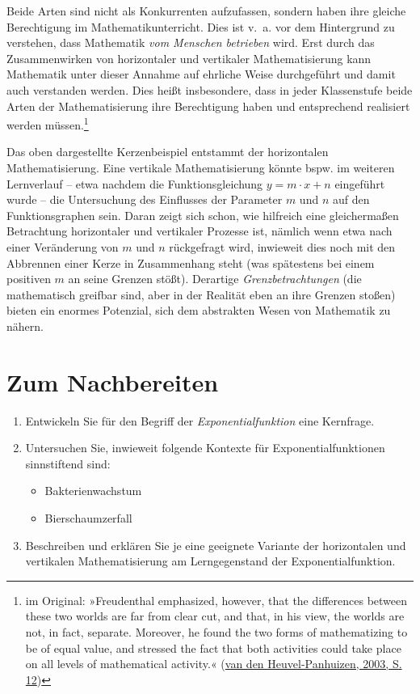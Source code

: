\documentclass[
]{scrbook}
\providecommand{\tightlist}{%
  \setlength{\itemsep}{0pt}\setlength{\parskip}{0pt}}
\theoremstyle{definition}
\theoremstyle{definition}
\theoremstyle{definition}
\theoremstyle{definition}
\theoremstyle{remark}
\begin{document}
Beide Arten sind nicht als Konkurrenten aufzufassen, sondern haben ihre gleiche Berechtigung im Mathematikunterricht. Dies ist v.~a. vor dem Hintergrund zu verstehen, dass Mathematik \emph{vom Menschen betrieben} wird. Erst durch das Zusammenwirken von horizontaler und vertikaler Mathematisierung kann Mathematik unter dieser Annahme auf ehrliche Weise durchgeführt und damit auch verstanden werden. Dies heißt insbesondere, dass in jeder Klassenstufe beide Arten der Mathematisierung ihre Berechtigung haben und entsprechend realisiert werden müssen.\footnote{im Original: »Freudenthal emphasized, however, that the differences between these two worlds are far from clear cut, and that, in his view, the worlds are not, in fact, separate. Moreover, he found the two forms of mathematizing to be of equal value, and stressed the fact that both activities could take place on all levels of mathematical activity.« (\protect\hyperlink{ref-vandenHeuvel-Panhuizen2003}{van den Heuvel-Panhuizen, 2003, S. 12})}

Das oben dargestellte Kerzenbeispiel entstammt der horizontalen Mathematisierung. Eine vertikale Mathematisierung könnte bspw. im weiteren Lernverlauf -- etwa nachdem die Funktionsgleichung \(y = m\cdot x + n\) eingeführt wurde -- die Untersuchung des Einflusses der Parameter \(m\) und \(n\) auf den Funktionsgraphen sein. Daran zeigt sich schon, wie hilfreich eine gleichermaßen Betrachtung horizontaler und vertikaler Prozesse ist, nämlich wenn etwa nach einer Veränderung von \(m\) und \(n\) rückgefragt wird, inwieweit dies noch mit den Abbrennen einer Kerze in Zusammenhang steht (was spätestens bei einem positiven \(m\) an seine Grenzen stößt). Derartige \emph{Grenzbetrachtungen} (die mathematisch greifbar sind, aber in der Realität eben an ihre Grenzen stoßen) bieten ein enormes Potenzial, sich dem abstrakten Wesen von Mathematik zu nähern.

\hypertarget{kernideen-kernfragen-kontexte-nachbereitung}{%
\section{Zum Nachbereiten}\label{kernideen-kernfragen-kontexte-nachbereitung}}

\begin{enumerate}
\def\labelenumi{\arabic{enumi}.}
\tightlist
\item
  Entwickeln Sie für den Begriff der \emph{Exponentialfunktion} eine Kernfrage.
\item
  Untersuchen Sie, inwieweit folgende Kontexte für Exponentialfunktionen sinnstiftend sind:

  \begin{itemize}
  \tightlist
  \item
    Bakterienwachstum
  \item
    Bierschaumzerfall
  \end{itemize}
\item
  Beschreiben und erklären Sie je eine geeignete Variante der horizontalen und vertikalen Mathematisierung am Lerngegenstand der Exponentialfunktion.
\end{enumerate}
\end{document}
